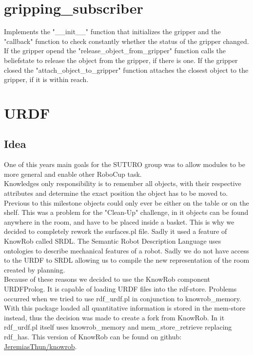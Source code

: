 \documentclass[main.tex]{subfiles}
\begin{document}
		\section{gripping\_subscriber}
		Implements the "\_\_init\_\_" function that initializes the gripper and the "callback" function to check constantly whether the status of the gripper changed. If the gripper opend the "release\_object\_from\_gripper" function calls the beliefstate to release the object from the gripper, if there is one. If the gripper closed the "attach\_object\_to\_gripper" function attaches the closest object to the gripper, if it is within reach.


		\section{URDF}
		
		\subsection{Idea}
		One of this years main goals for the SUTURO group was to allow modules to be more general and enable other RoboCup task.\\
		Knowledges only responsibility is to remember all objects, with their respective attributes and determine the exact position the object has to be moved to.\\
		Previous to this milestone objects could only ever be either on the table or on the shelf. This was a problem for the "Clean-Up" challenge, in it objects can be found anywhere in the room, and have to be placed inside a basket. This is why we decided to completely rework the surfaces.pl file. Sadly it used a feature of KnowRob called SRDL. The Semantic Robot Description Language uses ontologies to describe mechanical features of a robot. Sadly we do not have access to the URDF to SRDL allowing us to compile the new representation of the room created by planning.\\
		Because of these reasons we decided to use the KnowRob component URDFProlog. It is capable of loading URDF files into the rdf-store. Problems occurred when we tried to use rdf\_urdf.pl in conjunction to knowrob\_memory. With this package loaded all quantitative information is stored in the mem-store instead, thus the decision was made to create a fork from KnowRob. In it rdf\_urdf.pl itself uses knowrob\_memory and mem\_store\_retrieve replacing rdf\_has. This version of KnowRob  can be found on github: \hyperref[https://github.com/JeremiasThun/knowrob]{\mbox{JeremiasThun/knowrob}}.\\
		
\end{document}
